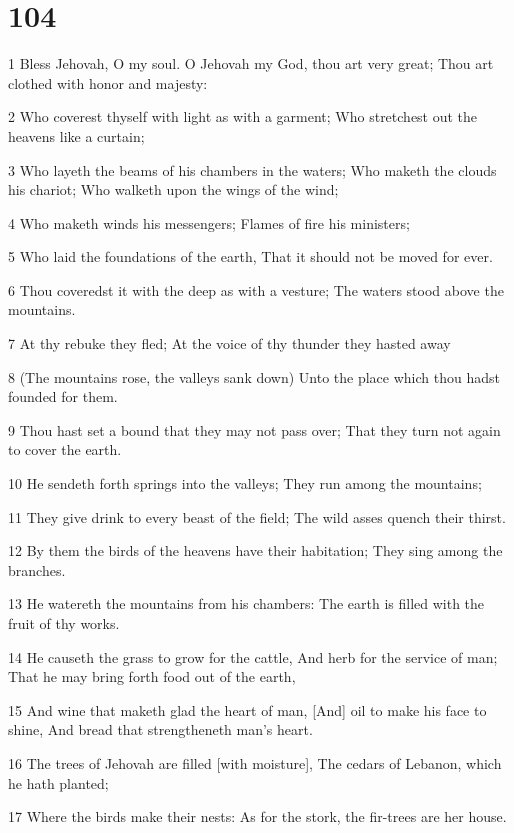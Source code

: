 \chapter{104}

\par 1 Bless Jehovah, O my soul. O Jehovah my God, thou art very great; Thou art clothed with honor and majesty:
\par 2 Who coverest thyself with light as with a garment; Who stretchest out the heavens like a curtain;
\par 3 Who layeth the beams of his chambers in the waters; Who maketh the clouds his chariot; Who walketh upon the wings of the wind;
\par 4 Who maketh winds his messengers; Flames of fire his ministers;
\par 5 Who laid the foundations of the earth, That it should not be moved for ever.
\par 6 Thou coveredst it with the deep as with a vesture; The waters stood above the mountains.
\par 7 At thy rebuke they fled; At the voice of thy thunder they hasted away
\par 8 (The mountains rose, the valleys sank down) Unto the place which thou hadst founded for them.
\par 9 Thou hast set a bound that they may not pass over; That they turn not again to cover the earth.
\par 10 He sendeth forth springs into the valleys; They run among the mountains;
\par 11 They give drink to every beast of the field; The wild asses quench their thirst.
\par 12 By them the birds of the heavens have their habitation; They sing among the branches.
\par 13 He watereth the mountains from his chambers: The earth is filled with the fruit of thy works.
\par 14 He causeth the grass to grow for the cattle, And herb for the service of man; That he may bring forth food out of the earth,
\par 15 And wine that maketh glad the heart of man, [And] oil to make his face to shine, And bread that strengtheneth man's heart.
\par 16 The trees of Jehovah are filled [with moisture], The cedars of Lebanon, which he hath planted;
\par 17 Where the birds make their nests: As for the stork, the fir-trees are her house.
